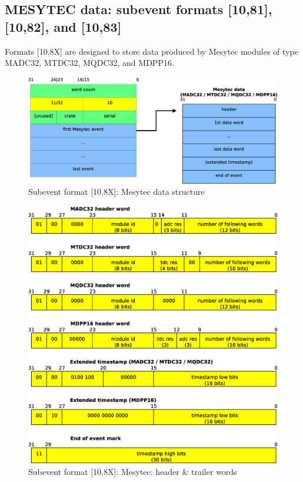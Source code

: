 \documentclass[10pt,a4paper]{article}
\begin{document}
\subsection{MESYTEC data: subevent formats [10,81], [10,82], and [10,83]}
Formats [10,8X] are designed to store data produced by Mesytec modules of type MADC32, MTDC32, MQDC32, and MDPP16.
\begin{figure}[H]
\centerline{\includegraphics[width=\linewidth]{MedSevt_Mesytec_1}}
\caption{Subevent format [10,8X]: Mesytec data structure}
\label{MedSevt_Mesytec_1}
\end{figure}
\newpage
\begin{figure}[H]
\centerline{\includegraphics[width=\linewidth]{MedSevt_Mesytec_2}}
\caption{Subevent format [10,8X]: Mesytec: header \& trailer words}
\label{MedSevt_Mesytec_2}
\end{figure}
\end{document}

